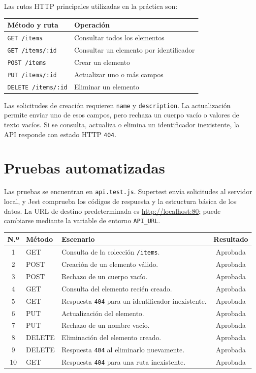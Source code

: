 \documentclass[12pt,a4paper]{article}
\begin{document}
Las rutas HTTP principales utilizadas en la práctica son:
\begin{center}
\begin{tabular}{@{}ll@{}}
\toprule
\textbf{Método y ruta} & \textbf{Operación} \\
\midrule
\texttt{GET /items} & Consultar todos los elementos \\
\texttt{GET /items/:id} & Consultar un elemento por identificador \\
\texttt{POST /items} & Crear un elemento \\
\texttt{PUT /items/:id} & Actualizar uno o más campos \\
\texttt{DELETE /items/:id} & Eliminar un elemento \\
\bottomrule
\end{tabular}
\end{center}

Las solicitudes de creación requieren \texttt{name} y \texttt{description}. La actualización permite enviar uno de esos campos, pero rechaza un cuerpo vacío o valores de texto vacíos. Si se consulta, actualiza o elimina un identificador inexistente, la API responde con estado HTTP \texttt{404}.

\section{Pruebas automatizadas}
Las pruebas se encuentran en \texttt{api.test.js}. Supertest envía solicitudes al servidor local, y Jest comprueba los códigos de respuesta y la estructura básica de los datos. La URL de destino predeterminada es \url{http://localhost:80}; puede cambiarse mediante la variable de entorno \texttt{API\_URL}.

\begin{center}
\begin{tabular}{@{}clp{8.2cm}c@{}}
\toprule
\textbf{N.º} & \textbf{Método} & \textbf{Escenario} & \textbf{Resultado} \\
\midrule
1 & GET & Consulta de la colección \texttt{/items}. & Aprobada \\
2 & POST & Creación de un elemento válido. & Aprobada \\
3 & POST & Rechazo de un cuerpo vacío. & Aprobada \\
4 & GET & Consulta del elemento recién creado. & Aprobada \\
5 & GET & Respuesta \texttt{404} para un identificador inexistente. & Aprobada \\
6 & PUT & Actualización del elemento. & Aprobada \\
7 & PUT & Rechazo de un nombre vacío. & Aprobada \\
8 & DELETE & Eliminación del elemento creado. & Aprobada \\
9 & DELETE & Respuesta \texttt{404} al eliminarlo nuevamente. & Aprobada \\
10 & GET & Respuesta \texttt{404} para una ruta inexistente. & Aprobada \\
\bottomrule
\end{tabular}
\end{center}
\end{document}
